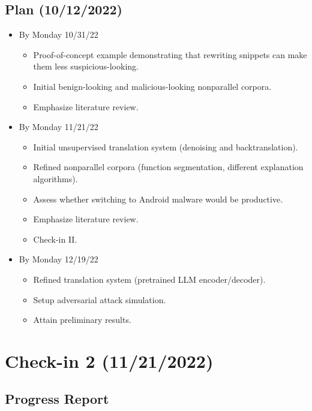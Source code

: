 \documentclass{article}
\begin{document}
\subsection*{Plan (10/12/2022)}

\begin{itemize}
	\item By Monday 10/31/22
	\begin{itemize}
		\item Proof-of-concept example demonstrating that rewriting snippets can make them less suspicious-looking.
		\item Initial benign-looking and malicious-looking nonparallel corpora.
		\item Emphasize literature review.
	\end{itemize}
	\item By Monday 11/21/22
	\begin{itemize}
		\item Initial unsupervised translation system (denoising and backtranslation).
		\item Refined nonparallel corpora (function segmentation, different explanation algorithms).
		\item Assess whether switching to Android malware would be productive.
		\item Emphasize literature review.
		\item Check-in II.
	\end{itemize}
	\item By Monday 12/19/22
	\begin{itemize}
		\item Refined translation system (pretrained LLM encoder/decoder).
		\item Setup adversarial attack simulation.
		\item Attain preliminary results.
	\end{itemize}
\end{itemize}

\pagebreak

\section*{Check-in 2 (11/21/2022)}

\subsection*{Progress Report}
\end{document}
